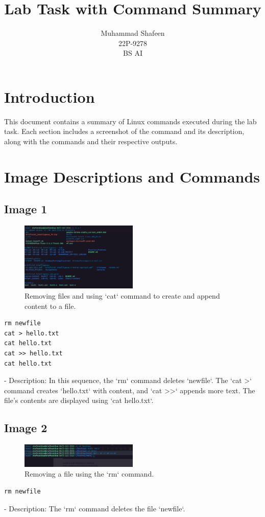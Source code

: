 \documentclass[12pt]{article}
\title{Lab Task with Command Summary}
\author{Muhammad Shafeen \\ 22P-9278 \\ BS AI}
\date{}
\begin{document}
\maketitle

\section*{Introduction}
This document contains a summary of Linux commands executed during the lab task. Each section includes a screenshot of the command and its description, along with the commands and their respective outputs.

\section*{Image Descriptions and Commands}

\subsection*{Image 1}
\begin{figure}[h!]
    \centering
    \includegraphics[width=0.5\textwidth]{1.png}
    \caption{Removing files and using `cat` command to create and append content to a file.}
\end{figure}
\begin{lstlisting}
rm newfile
cat > hello.txt
cat hello.txt
cat >> hello.txt
cat hello.txt
\end{lstlisting}
- Description: In this sequence, the `rm` command deletes `newfile`. The `cat >` command creates `hello.txt` with content, and `cat >>` appends more text. The file's contents are displayed using `cat hello.txt`.

\subsection*{Image 2}
\begin{figure}[h!]
    \centering
    \includegraphics[width=0.5\textwidth]{2.png}
    \caption{Removing a file using the `rm` command.}
\end{figure}
\begin{lstlisting}
rm newfile
\end{lstlisting}
- Description: The `rm` command deletes the file `newfile`.
\end{document}
